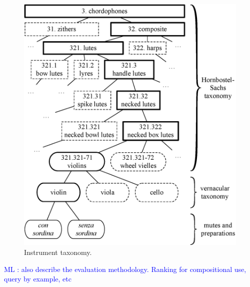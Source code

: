 \documentclass{article}
\newcommand{\ml}[1]{\textcolor{blue}{ML : #1}}
\begin{document}
\begin{figure}
\centering
\includegraphics[width=\linewidth]{./figs/dendrograms/instrument-dendrogram.eps}
\caption{Instrument taxonomy.}
\label{fig:instrument-dendrogram}
\end{figure}







\ml{also describe the evaluation methodology. Ranking for compositional use, query by example, etc}
\end{document}
